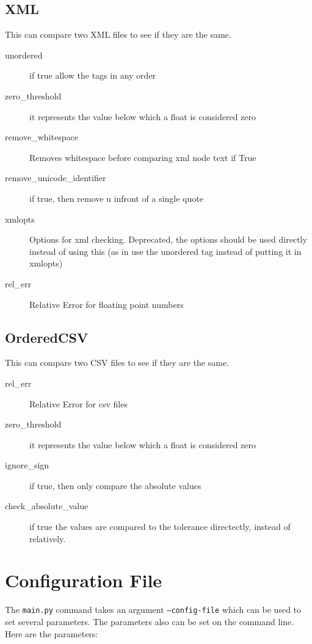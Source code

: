 \documentclass{article}
\begin{document}
\subsection{XML}

This can compare two XML files to see if they are the same.

\begin{description}
  \item[unordered] if true allow the tags in any order
  \item[zero\_threshold] it represents the value below which a float is considered zero
  \item[remove\_whitespace] Removes whitespace before comparing xml node text if True
  \item[remove\_unicode\_identifier] if true, then remove u infront of a single quote
  \item[xmlopts] Options for xml checking. Deprecated, the options should be used directly instead of using this (as in use the unordered tag instead of putting it in xmlopts)
  \item[rel\_err] Relative Error for floating point numbers
\end{description}

\subsection{OrderedCSV}

This can compare two CSV files to see if they are the same.

\begin{description}
  \item[rel\_err] Relative Error for csv files
  \item[zero\_threshold] it represents the value below which a float is considered zero
  \item[ignore\_sign] if true, then only compare the absolute values
  \item[check\_absolute\_value] if true the values are compared to the tolerance directectly, instead of relatively.
\end{description}

\section{Configuration File}

The {\tt main.py} command takes an argument {\tt --config-file} which can be used to set several parameters.  The parameters also can be set on the command line.  Here are the parameters:
\end{document}
